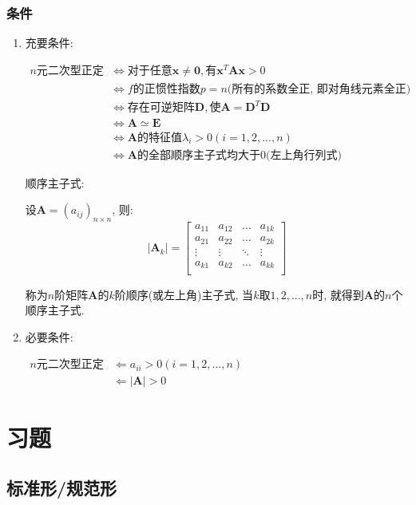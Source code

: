 \subsubsection{条件}
\begin{enumerate}
\item 充要条件: \par $ \begin{aligned}
n\text{元二次型正定} & \Leftrightarrow \text{对于任意}\bm{x}\neq \bm{0}, \text{有}\bm{x}^{T}\bm{A}\bm{x}>0 \\
& \Leftrightarrow f\text{的正惯性指数} p=n\text{(所有的系数全正, 即对角线元素全正)} \\
& \Leftrightarrow \text{存在可逆矩阵} \bm{D}, \text{使} \bm{A}=\bm{D}^{T}\bm{D} \\
& \Leftrightarrow \bm{A}\simeq \bm{E} \\
& \Leftrightarrow \bm{A}\text{的特征值} \lambda_{i}>0(i=1, 2,... ,n) \\
& \Leftrightarrow \bm{A}\text{的全部顺序主子式均大于0(左上角行列式)}
\end{aligned} $ \par
顺序主子式: \par
设$\bm{A}=(a_{ij})_{n\times n}$, 则:
\begin{equation*}
|\bm{A}_{k}|=
\begin{bmatrix}
a_{11} & a_{12} & \dots & a_{1k} \\
a_{21} & a_{22} & \dots & a_{2k} \\
\vdots & \vdots & \ddots & \vdots \\
a_{k1} & a_{k2} & \dots & a_{kk} \\
\end{bmatrix}
\end{equation*} \par
称为$n$阶矩阵$\bm{A}$的$k$阶顺序(或左上角)主子式, 当$k$取$1,2,...,n$时, 就得到$\bm{A}$的$n$个顺序主子式.
\item 必要条件: \par $ \begin{aligned}
n\text{元二次型正定} & \Leftarrow a_{ii}>0(i=1, 2,... ,n) \\
& \Leftarrow \left|\bm{A}\right|>0 
\end{aligned} $
\end{enumerate}
\section{习题}
\subsection{标准形/规范形}
